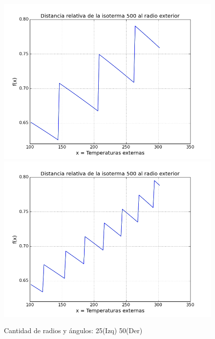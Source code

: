 \begin{figure}[h]
\centering

\includegraphics[scale=0.3]{experimentos1a_1b/evolucion_estimacion_seguridad_isoterma/variacion_25.png}
\includegraphics[scale=0.3]{experimentos1a_1b/evolucion_estimacion_seguridad_isoterma/variacion_50.png}	

\caption{Cantidad de radios y ángulos: 25(Izq) 50(Der)}
\end{figure}

